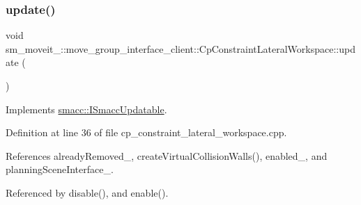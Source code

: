 \subsubsection{\texorpdfstring{update()}{update()}}
{\footnotesize\ttfamily void sm\+\_\+moveit\+\_\+::move\+\_\+group\+\_\+interface\+\_\+client\+::\+Cp\+Constraint\+Lateral\+Workspace\+::update (\begin{DoxyParamCaption}{ }\end{DoxyParamCaption})\hspace{0.3cm}{\ttfamily [virtual]}}



Implements \hyperlink{classsmacc_1_1ISmaccUpdatable_a84ee0520cbefdb1d412bed54650b028e}{smacc\+::\+I\+Smacc\+Updatable}.



Definition at line 36 of file cp\+\_\+constraint\+\_\+lateral\+\_\+workspace.\+cpp.



References already\+Removed\+\_\+, create\+Virtual\+Collision\+Walls(), enabled\+\_\+, and planning\+Scene\+Interface\+\_\+.



Referenced by disable(), and enable().


